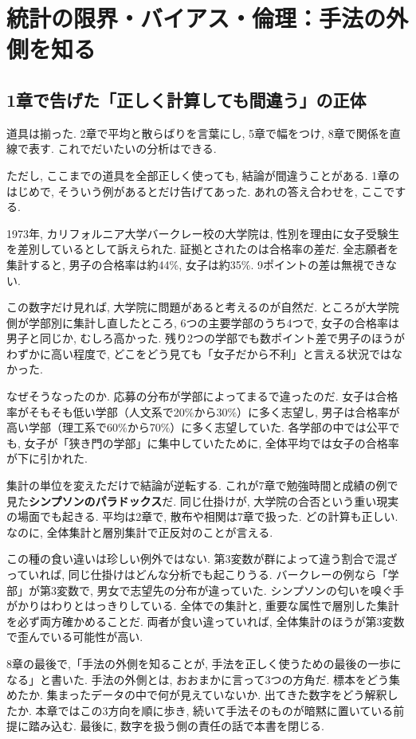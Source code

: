 ﻿\section{統計の限界・バイアス・倫理：手法の外側を知る}

\subsection{1章で告げた「正しく計算しても間違う」の正体}

道具は揃った.
2章で平均と散らばりを言葉にし, 5章で幅をつけ, 8章で関係を直線で表す. これでだいたいの分析はできる.

ただし, ここまでの道具を全部正しく使っても, 結論が間違うことがある.
1章のはじめで, そういう例があるとだけ告げてあった.
あれの答え合わせを, ここでする.

1973年, カリフォルニア大学バークレー校の大学院は, 性別を理由に女子受験生を差別しているとして訴えられた.
証拠とされたのは合格率の差だ.
全志願者を集計すると, 男子の合格率は約44\%, 女子は約35\%.
9ポイントの差は無視できない.

この数字だけ見れば, 大学院に問題があると考えるのが自然だ.
ところが大学院側が学部別に集計し直したところ, 6つの主要学部のうち4つで, 女子の合格率は男子と同じか, むしろ高かった.
残り2つの学部でも数ポイント差で男子のほうがわずかに高い程度で, どこをどう見ても「女子だから不利」と言える状況ではなかった.

なぜそうなったのか. 応募の分布が学部によってまるで違ったのだ.
女子は合格率がそもそも低い学部（人文系で20\%から30\%）に多く志望し, 男子は合格率が高い学部（理工系で60\%から70\%）に多く志望していた.
各学部の中では公平でも, 女子が「狭き門の学部」に集中していたために, 全体平均では女子の合格率が下に引かれた.

集計の単位を変えただけで結論が逆転する.
これが7章で勉強時間と成績の例で見た\textbf{シンプソンのパラドックス}だ. 同じ仕掛けが, 大学院の合否という重い現実の場面でも起きる.
平均は2章で, 散布や相関は7章で扱った. どの計算も正しい.
なのに, 全体集計と層別集計で正反対のことが言える.

この種の食い違いは珍しい例外ではない.
第3変数が群によって違う割合で混ざっていれば, 同じ仕掛けはどんな分析でも起こりうる.
バークレーの例なら「学部」が第3変数で, 男女で志望先の分布が違っていた.
シンプソンの匂いを嗅ぐ手がかりはわりとはっきりしている. 全体での集計と, 重要な属性で層別した集計を必ず両方確かめることだ.
両者が食い違っていれば, 全体集計のほうが第3変数で歪んでいる可能性が高い.

8章の最後で,「手法の外側を知ることが, 手法を正しく使うための最後の一歩になる」と書いた.
手法の外側とは, おおまかに言って3つの方角だ.
標本をどう集めたか. 集まったデータの中で何が見えていないか. 出てきた数字をどう解釈したか.
本章ではこの3方向を順に歩き, 続いて手法そのものが暗黙に置いている前提に踏み込む.
最後に, 数字を扱う側の責任の話で本書を閉じる.

